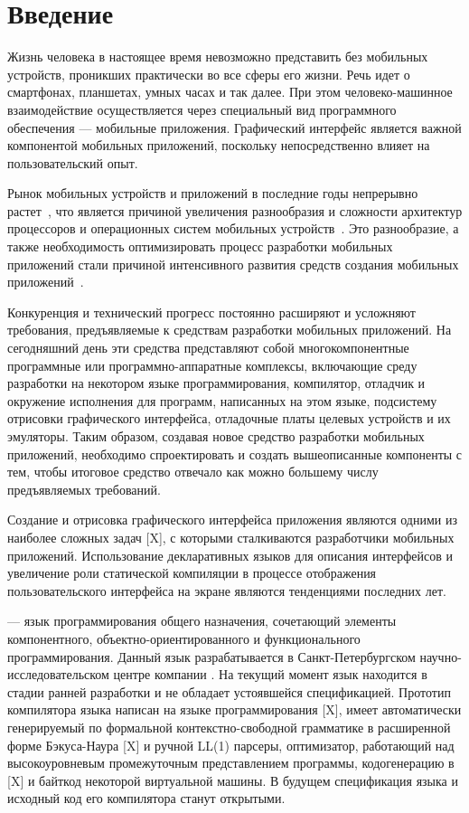 \section*{Введение}
Жизнь человека в настоящее время невозможно представить без мобильных
устройств, проникших практически во все сферы его жизни. Речь идет о
смартфонах, планшетах, умных часах и так далее. При этом человеко-машинное
взаимодействие осуществляется через специальный вид программного обеспечения --- мобильные приложения. Графический интерфейс является важной компонентой
мобильных приложений, поскольку непосредственно влияет на пользовательский
опыт.

Рынок мобильных устройств и приложений в последние годы непрерывно
растет~\cite{device-market-stat}, что является причиной увеличения разнообразия и сложности архитектур процессоров и операционных систем
мобильных устройств~\cite{cpu-arches, mobile-phones-cpu-trends}. Это
разнообразие, а также необходимость оптимизировать процесс разработки мобильных приложений стали причиной интенсивного развития средств создания
мобильных приложений~\cite{mob-apps-approaches,kotlin-homepage,swiftui-homepage,flutter-homepage, reactnative-homepage, vuenative-homepage}.

Конкуренция и технический прогресс постоянно расширяют и усложняют
требования, предъявляемые к средствам разработки мобильных приложений. На
сегодняшний день эти средства представляют собой многокомпонентные программные или программно-аппаратные комплексы, включающие среду разработки
на некотором языке программирования, компилятор, отладчик и окружение исполнения для программ, написанных на этом языке, подсистему отрисовки
графического интерфейса, отладочные платы целевых устройств и их эмуляторы.
Таким образом, создавая новое средство разработки мобильных приложений,
необходимо спроектировать и создать вышеописанные компоненты с тем, чтобы
итоговое средство отвечало как можно большему числу предъявляемых требований.

Создание и отрисовка графического интерфейса приложения являются одними из
наиболее сложных задач [X], с которыми сталкиваются разработчики мобильных
приложений. Использование декларативных языков для описания интерфейсов и
увеличение роли статической компиляции в процессе отображения
пользовательского интерфейса на экране являются тенденциями последних лет.

 --- язык программирования общего назначения, сочетающий
элементы компонентного, объектно-ориентированного и функционального
программирования. Данный язык разрабатывается в Санкт-Петербургском
научно-исследовательском центре компании . На текущий момент
язык находится в стадии ранней разработки и не обладает устоявшейся спецификацией. Прототип компилятора языка  написан на языке
программирования  [X], имеет автоматически генерируемый по
формальной контекстно-свободной грамматике в расширенной форме Бэкуса-Наура
[X] и ручной LL(1) парсеры, оптимизатор, работающий над высокоуровневым
промежуточным представлением программы, кодогенерацию в  [X] и
байткод некоторой виртуальной машины. В будущем спецификация языка
 и исходный код его компилятора станут открытыми.

